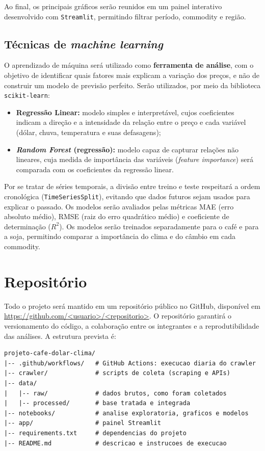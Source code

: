 \documentclass{article}
\begin{document}
Ao final, os principais gráficos serão reunidos em um painel interativo desenvolvido com
\texttt{Streamlit}, permitindo filtrar período, commodity e região.

\subsection{Técnicas de \textit{machine learning}}

O aprendizado de máquina será utilizado como \textbf{ferramenta de análise}, com o objetivo de
identificar quais fatores mais explicam a variação dos preços, e não de construir um modelo de previsão
perfeito. Serão utilizados, por meio da biblioteca \texttt{scikit-learn}:

\begin{itemize}
      \item \textbf{Regressão Linear:} modelo simples e interpretável, cujos coeficientes indicam a direção
            e a intensidade da relação entre o preço e cada variável (dólar, chuva, temperatura e suas
            defasagens);
      \item \textbf{\textit{Random Forest} (regressão):} modelo capaz de capturar relações não lineares, cuja
            medida de importância das variáveis (\textit{feature importance}) será comparada com os
            coeficientes da regressão linear.
\end{itemize}

Por se tratar de séries temporais, a divisão entre treino e teste respeitará a ordem cronológica
(\texttt{TimeSeriesSplit}), evitando que dados futuros sejam usados para explicar o passado. Os modelos
serão avaliados pelas métricas MAE (erro absoluto médio), RMSE (raiz do erro quadrático médio) e
coeficiente de determinação ($R^2$). Os modelos serão treinados separadamente para o café e para a soja,
permitindo comparar a importância do clima e do câmbio em cada commodity.


\section{Repositório}

Todo o projeto será mantido em um repositório público no GitHub, disponível em
\url{https://github.com/<usuario>/<repositorio>}. O repositório garantirá o versionamento do código, a
colaboração entre os integrantes e a reprodutibilidade das análises. A estrutura prevista é:

\begin{verbatim}
projeto-cafe-dolar-clima/
|-- .github/workflows/   # GitHub Actions: execucao diaria do crawler
|-- crawler/             # scripts de coleta (scraping e APIs)
|-- data/
|   |-- raw/             # dados brutos, como foram coletados
|   |-- processed/       # base tratada e integrada
|-- notebooks/           # analise exploratoria, graficos e modelos
|-- app/                 # painel Streamlit
|-- requirements.txt     # dependencias do projeto
|-- README.md            # descricao e instrucoes de execucao
\end{verbatim}
\end{document}
